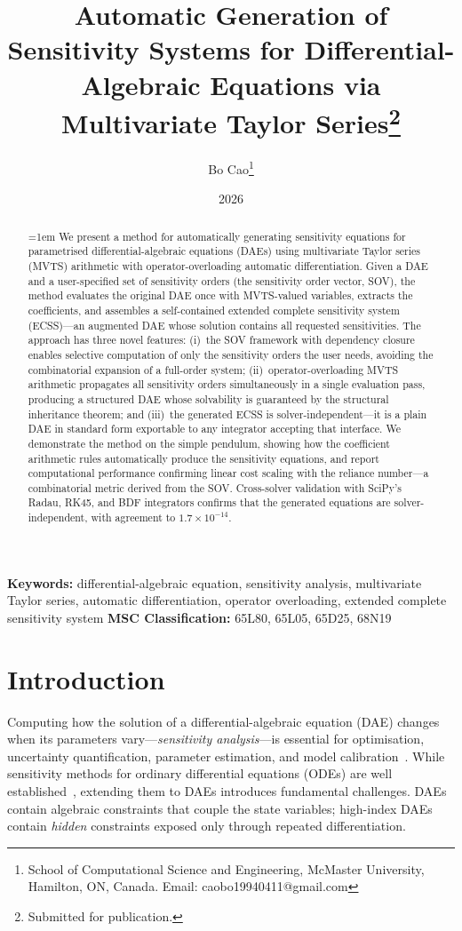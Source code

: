 \documentclass[12pt,a4paper]{article}
\title{\bfseries Automatic Generation of Sensitivity Systems for Differential-Algebraic Equations via Multivariate Taylor Series\thanks{Submitted for publication.}}
\author{Bo Cao\thanks{School of Computational Science and Engineering, McMaster University, Hamilton, ON, Canada. Email: caobo19940411@gmail.com}}
\date{2026}
\theoremstyle{definition}
\theoremstyle{plain}
\theoremstyle{remark}
\newcommand{\keywords}[1]{\noindent\textbf{Keywords:} #1}
\newcommand{\MSC}[1]{\noindent\textbf{MSC Classification:} #1}
\begin{document}
\maketitle

\begin{abstract}
\emergencystretch=1em
We present a method for automatically generating sensitivity equations for parametrised differential-algebraic equations (DAEs) using multivariate Taylor series (MVTS) arithmetic with operator-overloading automatic differentiation. Given a DAE and a user-specified set of sensitivity orders (the sensitivity order vector, SOV), the method evaluates the original DAE once with MVTS-valued variables, extracts the coefficients, and assembles a self-contained extended complete sensitivity system (ECSS)---an augmented DAE whose solution contains all requested sensitivities. The approach has three novel features: (i)~the SOV framework with dependency closure enables selective computation of only the sensitivity orders the user needs, avoiding the combinatorial expansion of a full-order system; (ii)~operator-overloading MVTS arithmetic propagates all sensitivity orders simultaneously in a single evaluation pass, producing a structured DAE whose solvability is guaranteed by the structural inheritance theorem; and (iii)~the generated ECSS is solver-independent---it is a plain DAE in standard form exportable to any integrator accepting that interface. We demonstrate the method on the simple pendulum, showing how the coefficient arithmetic rules automatically produce the sensitivity equations, and report computational performance confirming linear cost scaling with the reliance number---a combinatorial metric derived from the SOV. Cross-solver validation with SciPy's Radau, RK45, and BDF integrators confirms that the generated equations are solver-independent, with agreement to $1.7\times10^{-14}$.
\end{abstract}

\keywords{differential-algebraic equation, sensitivity analysis, multivariate Taylor series, automatic differentiation, operator overloading, extended complete sensitivity system}
\MSC{65L80, 65L05, 65D25, 68N19}

\section{Introduction}

Computing how the solution of a differential-algebraic equation (DAE) changes when its parameters vary---\emph{sensitivity analysis}---is essential for optimisation, uncertainty quantification, parameter estimation, and model calibration~\cite{rabitz1999efficient,isukapalli1998stochastic}. While sensitivity methods for ordinary differential equations (ODEs) are well established~\cite{dickinson1976sensitivity,sandu1997sensitivity}, extending them to DAEs introduces fundamental challenges. DAEs contain algebraic constraints that couple the state variables; high-index DAEs contain \emph{hidden} constraints exposed only through repeated differentiation.
\end{document}
